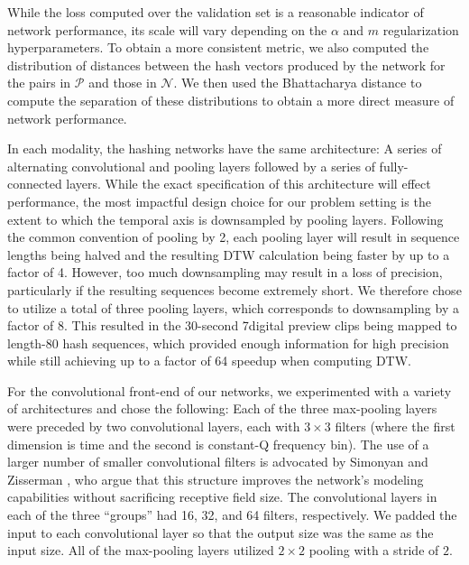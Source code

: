 While the loss computed over the validation set is a reasonable indicator of network performance, its scale will vary depending on the $\alpha$ and $m$ regularization hyperparameters.
To obtain a more consistent metric, we also computed the distribution of distances between the hash vectors produced by the network for the pairs in $\mathcal{P}$ and those in $\mathcal{N}$.
We then used the Bhattacharya distance \cite{bhattacharyya1943measure} to compute the separation of these distributions to obtain a more direct measure of network performance.

In each modality, the hashing networks have the same architecture: A series of alternating convolutional and pooling layers followed by a series of fully-connected layers.
While the exact specification of this architecture will effect performance, the most impactful design choice for our problem setting is the extent to which the temporal axis is downsampled by pooling layers.
Following the common convention of pooling by 2, each pooling layer will result in sequence lengths being halved and the resulting DTW calculation being faster by up to a factor of 4.
However, too much downsampling may result in a loss of precision, particularly if the resulting sequences become extremely short.
We therefore chose to utilize a total of three pooling layers, which corresponds to downsampling by a factor of 8.
This resulted in the 30-second 7digital preview clips being mapped to length-80 hash sequences, which provided enough information for high precision while still achieving up to a factor of 64 speedup when computing DTW.

For the convolutional front-end of our networks, we experimented with a variety of architectures and chose the following:
Each of the three max-pooling layers were preceded by two convolutional layers, each with $3 \times 3$ filters (where the first dimension is time and the second is constant-Q frequency bin).
The use of a larger number of smaller convolutional filters is advocated by Simonyan and Zisserman \cite{simonyan2014very}, who argue that this structure improves the network's modeling capabilities without sacrificing receptive field size.
The convolutional layers in each of the three ``groups'' had 16, 32, and 64 filters, respectively.
We padded the input to each convolutional layer so that the output size was the same as the input size.
All of the max-pooling layers utilized $2 \times 2$ pooling with a stride of $2$.

